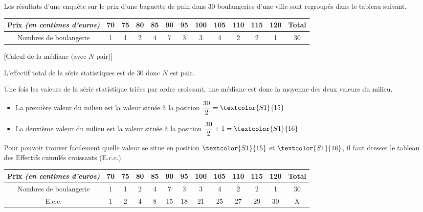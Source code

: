 \begin{ex}{}{}
Les résultats d'une enquête sur le prix d'une baguette de pain dans 30 boulangeries d'une ville sont regroupés dans le tableau suivant.
\begin{center}
\renewcommand{\arraystretch}{1.9}
\begin{tabular}{|c|c|c|c|c|c|c|c|c|c|c|c|c|}
\hline 
Prix \textit{(en centimes d'euros)} & 70 & 75 & 80 & 85 & 90 & 95 & 100 & 105 & 110 & 115 & 120 & Total \\ 
\hline 
Nombres de boulangerie & 1 & 1 & 2 & 4 & 7 & 3 & 3 & 4 & 2 & 2 & 1 & 30 \\ 
\hline 
\end{tabular} 
\end{center}

\begin{methode}{}{}[Calcul de la médiane (avec $N$ pair)]\label{meth_med_pair}

L'effectif total de la série statistiques est de $30$ donc $N$ est pair.

\noindent Une fois les valeurs de la série statistique triées par ordre croissant, une médiane est donc la moyenne des deux valeurs du milieu.
\begin{itemize}
\item[-]La première valeur du milieu est la valeur située à la position $ \dfrac{30}{2} = \textcolor{S1}{15} $
\item[-]La deuxième valeur du milieu est la valeur située à la position $ \dfrac{30}{2}+1 = \textcolor{S1}{16} $
\end{itemize}

\noindent Pour pouvoir trouver facilement quelle valeur se situe en position $\textcolor{S1}{15}$ et $\textcolor{S1}{16}$, il faut dresser le tableau des Effectifs cumulés croissants (E.c.c.).
\begin{center}
\renewcommand{\arraystretch}{1.8}
\begin{tabular}{|c|c|c|c|c|c|c|c|c|c|c|c|c|}
\hline 
Prix \textit{(en centimes d'euros)} & 70 & 75 & 80 & 85 & \textcolor{S2}{90} & \textcolor{S2}{95} & 100 & 105 & 110 & 115 & 120 & Total \\ 
\hline 
Nombres de boulangerie & 1 & 1 & 2 & 4 & 7 & 3 & 3 & 4 & 2 & 2 & 1 & 30 \\ 
\hline 
E.c.c. & 1 & 2 & 4 & 8 & \textcolor{S1}{15} & \textcolor{S1}{18} & 21 & 25 & 27 & 29 & 30 & X \\ 
\hline 
\end{tabular} 
\end{center}


\end{methode}
\end{ex}
